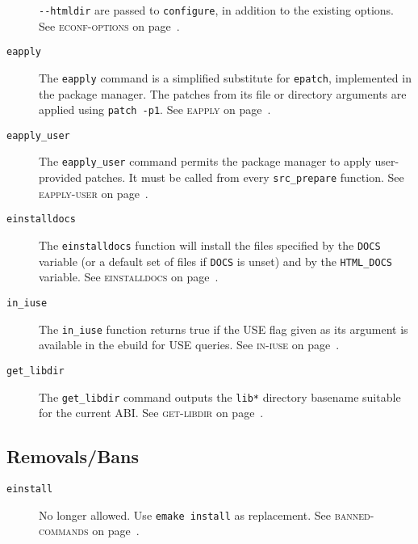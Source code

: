 \documentclass[a4paper,nofoldmark]{leaflet}
\newcommand{\code}[1]{\texttt{#1}}
\newcommand{\featureref}[1]{\textsc{#1} on page~\pageref{feat:#1}}
\begin{document}
\begin{description}
    \code{-{}-htmldir} are passed to \code{configure}, in addition to
    the existing options.
    See \featureref{econf-options}.
    \item[\code{eapply}] The \code{eapply} command is a simplified
    substitute for \code{epatch}, implemented in the package manager.
    The patches from its file or directory arguments are applied using
    \code{patch -p1}.
    See \featureref{eapply}.
    \item[\code{eapply_user}] The \code{eapply_user} command permits
    the package manager to apply user-provided patches. It must be
    called from every \code{src_prepare} function.
    See \featureref{eapply-user}.
    \item[\code{einstalldocs}] The \code{einstalldocs} function will
    install the files specified by the \code{DOCS} variable (or a
    default set of files if \code{DOCS} is unset) and by the
    \code{HTML_DOCS} variable.
    See \featureref{einstalldocs}.
    \item[\code{in_iuse}] The \code{in_iuse} function returns
    true if the USE flag given as its argument is available in the
    ebuild for USE queries.
    See \featureref{in-iuse}.
    \item[\code{get_libdir}] The \code{get_libdir} command outputs
    the \code{lib*} directory basename suitable for the current ABI.
    See \featureref{get-libdir}.
\end{description}
\subsection{Removals/Bans}
\label{sec:cs:eapi6-removalsbans}
\begin{description}
    \item[\code{einstall}] No longer allowed. Use \code{emake install}
    as replacement.
    See \featureref{banned-commands}.
\end{description}
\end{document}
